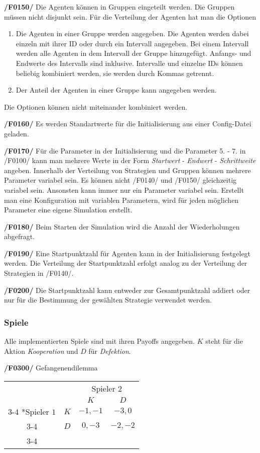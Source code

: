 \textbf{/F0150/} 
Die Agenten können in Gruppen eingeteilt werden. Die Gruppen müssen nicht disjunkt sein. Für die Verteilung der Agenten hat man die Optionen
\begin{enumerate}
\item Die Agenten in einer Gruppe werden angegeben. Die Agenten werden dabei einzeln mit ihrer ID oder durch ein Intervall angegeben. Bei einem Intervall werden alle Agenten in dem Intervall der Gruppe hinzugefügt. Anfangs- und Endwerte des Intervalls sind inklusive. Intervalle und einzelne IDs können beliebig kombiniert werden, sie werden durch Kommas getrennt.
\item Der Anteil der Agenten in einer Gruppe kann angegeben werden. 
\end{enumerate}
{\color{red}Die Optionen können nicht miteinander kombiniert werden.}

\textbf{/F0160/} 
Es werden Standartwerte für die Initialisierung aus einer Config-Datei geladen.

\textbf{/F0170/} 
Für die Parameter in der Initialisierung und die Parameter 5. - 7. in /F0100/ kann man mehrere Werte in der Form \emph{Startwert} - \emph{Endwert} - \emph{Schrittweite} angeben. Innerhalb der Verteilung von Strategien und Gruppen können mehrere Parameter variabel sein. Es können nicht /F0140/ und /F0150/ gleichzeitig variabel sein. Ansonsten kann immer nur ein Parameter variabel sein. Erstellt man eine Konfiguration mit variablen Parametern, wird für jeden möglichen Parameter eine eigene Simulation erstellt.

\textbf{/F0180/}
Beim Starten der Simulation wird die Anzahl der Wiederholungen abgefragt.

\textbf{/F0190/}
Eine Startpunktzahl für Agenten kann in der Initialisierung festgelegt werden. Die Verteilung der Startpunktzahl erfolgt analog zu der Verteilung der Strategien in /F0140/.

\textbf{/F0200/}
Die Startpunktzahl kann entweder zur Gesamtpunktzahl addiert oder nur für die Bestimmung der gewählten Strategie verwendet werden. 

\subsubsection{Spiele}
Alle implementierten Spiele sind mit ihren Payoffs angegeben. $K$ steht für die Aktion \emph{Kooperation} und $D$ für \emph{Defektion}.

\textbf{/F0300/} 
Gefangenendilemma
\begin{table}[H]
\centering
\setlength{\extrarowheight}{2pt}
\begin{tabular}{cc|c|c|}
  & \multicolumn{1}{c}{} & \multicolumn{2}{c}{Spieler $2$} \\
  & \multicolumn{1}{c}{} & \multicolumn{1}{c}{$K$} & \multicolumn{1}{c}{$D$} \\\cline{3-4}
  \multirow{2}*{Spieler $1$} & $K$ & $-1,-1$ & $-3,0$ \\\cline{3-4} 
  & $D$ & $0,-3$ & $-2,-2$ \\\cline{3-4}
\end{tabular}
\end{table}

